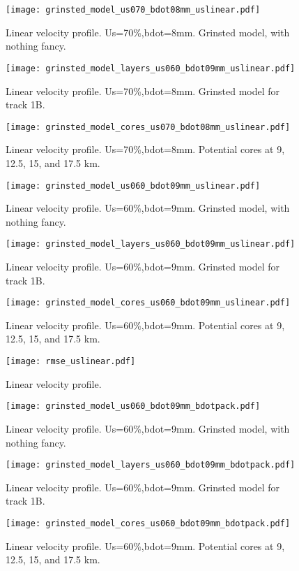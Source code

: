 \documentclass[11pt, oneside]{article}   	%
\begin{document}
\begin{figure}
	\centerline{\texttt{[image: grinsted\_model\_us070\_bdot08mm\_uslinear.pdf]}}
	\caption{Linear velocity profile. Us=70\%,bdot=8mm. Grinsted model, with nothing fancy.}

	\centerline{\texttt{[image: grinsted\_model\_layers\_us060\_bdot09mm\_uslinear.pdf]}}
	\caption{Linear velocity profile. Us=70\%,bdot=8mm. Grinsted model for track 1B.}
\end{figure}
\begin{figure}
	\centerline{\texttt{[image: grinsted\_model\_cores\_us070\_bdot08mm\_uslinear.pdf]}}
	\caption{Linear velocity profile. Us=70\%,bdot=8mm. Potential cores at 9, 12.5, 15, and 17.5 km.}
\end{figure}



\begin{figure}
	\centerline{\texttt{[image: grinsted\_model\_us060\_bdot09mm\_uslinear.pdf]}}
	\caption{Linear velocity profile. Us=60\%,bdot=9mm. Grinsted model, with nothing fancy.}

	\centerline{\texttt{[image: grinsted\_model\_layers\_us060\_bdot09mm\_uslinear.pdf]}}
	\caption{Linear velocity profile. Us=60\%,bdot=9mm. Grinsted model for track 1B.}
\end{figure}
\begin{figure}
	\centerline{\texttt{[image: grinsted\_model\_cores\_us060\_bdot09mm\_uslinear.pdf]}}
	\caption{Linear velocity profile. Us=60\%,bdot=9mm. Potential cores at 9, 12.5, 15, and 17.5 km.}
\end{figure}

\begin{figure}
	\centerline{\texttt{[image: rmse\_uslinear.pdf]}}
	\caption{Linear velocity profile.}
\end{figure}

\begin{figure}
	\centerline{\texttt{[image: grinsted\_model\_us060\_bdot09mm\_bdotpack.pdf]}}
	\caption{Linear velocity profile. Us=60\%,bdot=9mm. Grinsted model, with nothing fancy.}

	\centerline{\texttt{[image: grinsted\_model\_layers\_us060\_bdot09mm\_bdotpack.pdf]}}
	\caption{Linear velocity profile. Us=60\%,bdot=9mm. Grinsted model for track 1B.}
\end{figure}
\begin{figure}
	\centerline{\texttt{[image: grinsted\_model\_cores\_us060\_bdot09mm\_bdotpack.pdf]}}
	\caption{Linear velocity profile. Us=60\%,bdot=9mm. Potential cores at 9, 12.5, 15, and 17.5 km.}
\end{figure}
\end{document}
